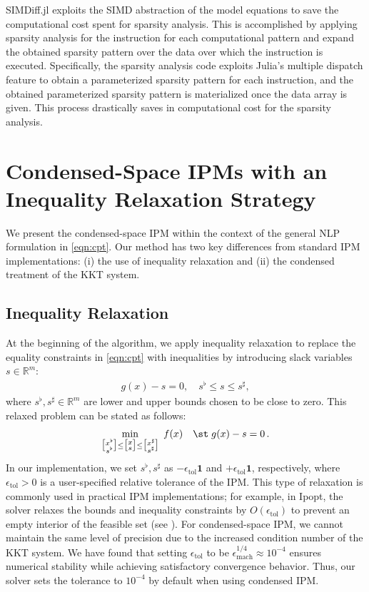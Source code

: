 SIMDiff.jl exploits the SIMD abstraction of the model equations to
save the computational cost spent for sparsity analysis.  This is
accomplished by applying sparsity analysis for the instruction for
each computational pattern and expand the obtained sparsity pattern
over the data over which the instruction is executed. Specifically,
the sparsity analysis code exploits Julia's multiple dispatch feature
to obtain a parameterized sparsity pattern for each instruction, and the
obtained parameterized sparsity pattern is materialized once the data
array is given. This process drastically saves in computational cost
for the sparsity analysis.

\section{Condensed-Space IPMs with an Inequality Relaxation Strategy}\label{sec:ipm}
We present the condensed-space IPM within the
context of the general NLP formulation in \eqref{eqn:cpt}. Our method
has two key differences from standard IPM
implementations: (i) the use of inequality relaxation and (ii) the
condensed treatment of the KKT system.

\subsection{Inequality Relaxation}

At the beginning of the algorithm, we apply inequality relaxation to replace the equality constraints in \eqref{eqn:cpt} with inequalities by introducing slack variables $s\in\mathbb{R}^{m}$:
\begin{align}\label{eqn:relax}
  g(x)- s = 0,\quad s^{\flat}\leq s\leq  s^\sharp,
\end{align}
where $s^\flat,s^\sharp\in\mathbb{R}^{m}$ are lower and upper bounds chosen to be close to zero.
This relaxed problem can be stated as follows:
\begin{equation}\label{eqn:relaxed}
    \min_{\big[\substack{x^\flat\\s^\flat}\big]\leq \big[\substack{x\\s}\big] \leq \big[\substack{x^\sharp\\s^\sharp}\big]}\;
      f(x)\quad \st\;  g(x) - s = 0 \, .
\end{equation}
In our implementation, we set $s^{\flat},s^\sharp$ as
$-\epsilon_{\text{tol}}\boldsymbol{1}$ and $+\epsilon_{\text{tol}}\boldsymbol{1}$, respectively,
where $\epsilon_{\text{tol}}>0$ is a user-specified relative tolerance
of the IPM. This type of relaxation is
commonly used in practical IPM implementations; for example, in Ipopt,
the solver relaxes the bounds and inequality constraints by
$O(\epsilon_{\text{tol}})$ to prevent an empty interior of the
feasible set (see \cite[Section 3.5]{wachter2006implementation}).
For condensed-space IPM, we cannot maintain the same level of precision
due to the increased condition number of the KKT system.
We have found that setting $\epsilon_{\text{tol}}$ to be
$\epsilon_{\text{mach}}^{1/4}\approx 10^{-4}$ ensures numerical
stability while achieving satisfactory convergence behavior. Thus, our
solver sets the tolerance to $10^{-4}$ by default when using condensed
IPM.

